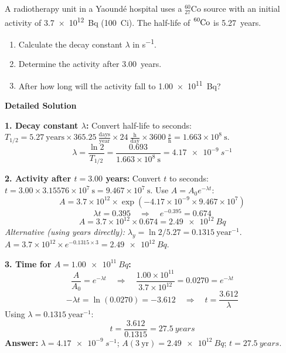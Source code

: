 \documentclass[11pt]{article}
\begin{document}
\begin{exoresolu}
A radiotherapy unit in a Yaoundé hospital uses a $\ensuremath{\mathrm{^{60}_{27}Co}}$ source with an initial activity of \SI{3.7e12}{Bq} (\SI{100}{Ci}). The half-life of $\ce{^{60}Co}$ is \SI{5.27}{years}.
\begin{enumerate}
\item Calculate the decay constant $\lambda$ in \si{s^{-1}}.
\item Determine the activity after \SI{3.00}{years}.
\item After how long will the activity fall to \SI{1.00e11}{Bq}?
\end{enumerate}
\tcblower
\textbf{Detailed Solution}

\textbf{1. Decay constant $\lambda$:}
Convert half-life to seconds:
$T_{1/2} = 5.27\ \text{years} \times 365.25\ \frac{\text{days}}{\text{year}} \times 24\ \frac{\text{h}}{\text{day}} \times 3600\ \frac{\text{s}}{\text{h}} = 1.663 \times 10^8\ \text{s}$.
\[
\lambda = \frac{\ln 2}{T_{1/2}} = \frac{0.693}{1.663 \times 10^8\ \text{s}} = \SI{4.17e-9}{s^{-1}}
\]

\textbf{2. Activity after $t = 3.00$ years:}
Convert $t$ to seconds: $t = 3.00 \times 3.15576 \times 10^7\ \text{s} = 9.467 \times 10^7\ \text{s}$.
Use $A = A_0 e^{-\lambda t}$:
\[
A = 3.7 \times 10^{12} \times \exp\left(-4.17 \times 10^{-9} \times 9.467 \times 10^7\right)
\]
\[
\lambda t = 0.395 \quad \Rightarrow \quad e^{-0.395} = 0.674
\]
\[
A = 3.7 \times 10^{12} \times 0.674 = \SI{2.49e12}{Bq}
\]
\textit{Alternative (using years directly):} $\lambda_y = \ln 2 / 5.27 = 0.1315\ \text{year}^{-1}$. $A = 3.7 \times 10^{12} \times e^{-0.1315 \times 3} = \SI{2.49e12}{Bq}$.

\textbf{3. Time for $A = \SI{1.00e11}{Bq}$:}
\[
\frac{A}{A_0} = e^{-\lambda t} \quad \Rightarrow \quad \frac{1.00 \times 10^{11}}{3.7 \times 10^{12}} = 0.0270 = e^{-\lambda t}
\]
\[
-\lambda t = \ln(0.0270) = -3.612 \quad \Rightarrow \quad t = \frac{3.612}{\lambda}
\]
Using $\lambda = 0.1315\ \text{year}^{-1}$:
\[
t = \frac{3.612}{0.1315} = \SI{27.5}{years}
\]
\textbf{Answer:} $\lambda = \SI{4.17e-9}{s^{-1}}$; $A(3\ \text{yr}) = \SI{2.49e12}{Bq}$; $t = \SI{27.5}{years}$.
\end{exoresolu}
\end{document}

